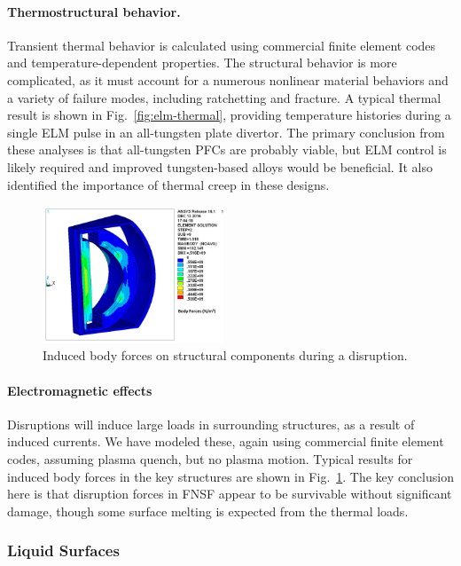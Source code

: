 \paragraph{Thermostructural behavior.} Transient thermal behavior is
calculated using commercial finite element codes and temperature-dependent
properties. The structural behavior is more complicated, as it must account
for a numerous nonlinear material behaviors and a variety of failure modes,
including ratchetting and fracture. A typical thermal result is shown in
Fig.\ \ref{fig:elm-thermal}, providing temperature histories during a single
\gls{ELM} pulse in an all-tungsten plate divertor. The primary conclusion from
these analyses is that all-tungsten \glspl{PFC} are probably viable, but
\gls{ELM} control is likely required and improved tungsten-based alloys would
be beneficial. It also identified the importance of thermal creep in these
designs.

\begin{figure}
\centering
\includegraphics[width=0.48\textwidth]{imgs/disrupt-em.png}
\caption{\label{fig:disrupt-em}Induced body forces on structural components during a disruption.}
\end{figure}

\paragraph{Electromagnetic effects} Disruptions will induce large loads in
surrounding structures, as a result of induced currents. We have modeled
these, again using commercial finite element codes, assuming plasma quench,
but no plasma motion. Typical results for induced body forces in the key
structures are shown in Fig.\ \ref{fig:disrupt-em}. The key conclusion here is
that disruption forces in FNSF appear to be survivable without significant
damage, though some surface melting is expected from the thermal loads.

\subsubsection{Liquid Surfaces}

